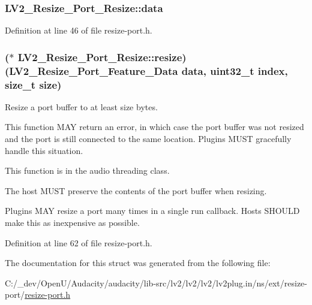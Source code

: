 \subsubsection[{\texorpdfstring{data}{data}}]{ L\+V2\+\_\+\+Resize\+\_\+\+Port\+\_\+\+Resize\+::data}\hypertarget{struct_l_v2___resize___port___resize_a3d64b6e7133cdae620b81286fb5ed2fa}{}\label{struct_l_v2___resize___port___resize_a3d64b6e7133cdae620b81286fb5ed2fa}


Definition at line 46 of file resize-\/port.\+h.

\subsubsection[{\texorpdfstring{resize}{resize}}]{($\ast$ L\+V2\+\_\+\+Resize\+\_\+\+Port\+\_\+\+Resize\+::resize) ({\bf L\+V2\+\_\+\+Resize\+\_\+\+Port\+\_\+\+Feature\+\_\+\+Data} {\bf data}, {\bf uint32\+\_\+t} index, size\+\_\+t {\bf size})}\hypertarget{struct_l_v2___resize___port___resize_aebcf76aa587acc573c14ae09370c444a}{}\label{struct_l_v2___resize___port___resize_aebcf76aa587acc573c14ae09370c444a}
Resize a port buffer to at least {\ttfamily size} bytes.

This function M\+AY return an error, in which case the port buffer was not resized and the port is still connected to the same location. Plugins M\+U\+ST gracefully handle this situation.

This function is in the audio threading class.

The host M\+U\+ST preserve the contents of the port buffer when resizing.

Plugins M\+AY resize a port many times in a single run callback. Hosts S\+H\+O\+U\+LD make this as inexpensive as possible. 

Definition at line 62 of file resize-\/port.\+h.



The documentation for this struct was generated from the following file\+:\begin{DoxyCompactItemize}
\item 
C\+:/\+\_\+dev/\+Open\+U/\+Audacity/audacity/lib-\/src/lv2/lv2/lv2/lv2plug.\+in/ns/ext/resize-\/port/\hyperlink{resize-port_8h}{resize-\/port.\+h}\end{DoxyCompactItemize}
